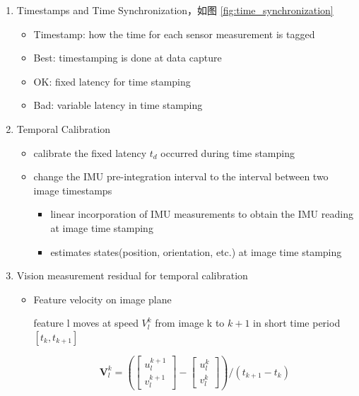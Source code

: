 \documentclass[12pt,a4paper]{article}
\begin{document}
\begin{enumerate}

\item Timestamps and Time Synchronization，如图 \ref{fig:time_synchronization}

\begin{itemize}
  \item Timestamp: how the time for each sensor measurement is tagged
  \item Best: timestamping is done at data capture
  \item OK: fixed latency for time stamping
  \item Bad: variable latency in time stamping
\end{itemize}

\item Temporal Calibration

\begin{itemize}
\item calibrate the fixed latency $t_d$ occurred during time stamping
\item change the IMU pre-integration interval to the interval between two image timestamps
  \begin{itemize}
  \item linear incorporation of IMU measurements to obtain the IMU reading at image time stamping
  \item estimates states(position, orientation, etc.) at image time stamping
  \end{itemize}
\end{itemize}

\item Vision measurement residual for temporal calibration \cite{qin2018online}

\begin{itemize}

\item Feature velocity on image plane

feature l moves at speed $V_l^k$ from image k to $k+1$ in short time period $[t_k,t_{k+1}]$

\begin{equation}
\mathbf{V}_{l}^{k}=\left(\left[\begin{array}{c}{u_{l}^{k+1}} \\ {v_{l}^{k+1}}\end{array}\right]-\left[\begin{array}{c}{u_{l}^{k}} \\ {v_{l}^{k}}\end{array}\right]\right) /\left(t_{k+1}-t_{k}\right)
\end{equation}


\end{itemize}
\end{enumerate}
\end{document}
